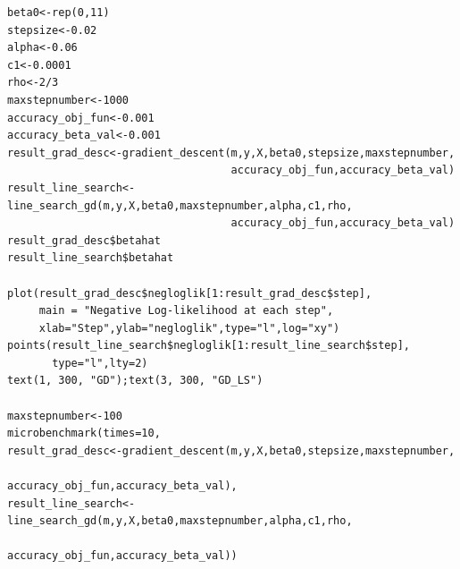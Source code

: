 \documentclass{article}
\begin{document}
\begin{lstlisting}[basicstyle=\small]
beta0<-rep(0,11)
stepsize<-0.02
alpha<-0.06
c1<-0.0001
rho<-2/3
maxstepnumber<-1000
accuracy_obj_fun<-0.001
accuracy_beta_val<-0.001
result_grad_desc<-gradient_descent(m,y,X,beta0,stepsize,maxstepnumber,
                                   accuracy_obj_fun,accuracy_beta_val)
result_line_search<-line_search_gd(m,y,X,beta0,maxstepnumber,alpha,c1,rho,
                                   accuracy_obj_fun,accuracy_beta_val)
result_grad_desc$betahat
result_line_search$betahat

plot(result_grad_desc$negloglik[1:result_grad_desc$step],
     main = "Negative Log-likelihood at each step",
     xlab="Step",ylab="negloglik",type="l",log="xy")
points(result_line_search$negloglik[1:result_line_search$step],
       type="l",lty=2)
text(1, 300, "GD");text(3, 300, "GD_LS")

maxstepnumber<-100
microbenchmark(times=10,
result_grad_desc<-gradient_descent(m,y,X,beta0,stepsize,maxstepnumber,
                                   accuracy_obj_fun,accuracy_beta_val),
result_line_search<-line_search_gd(m,y,X,beta0,maxstepnumber,alpha,c1,rho,
                                   accuracy_obj_fun,accuracy_beta_val))
\end{lstlisting}
\end{document}
